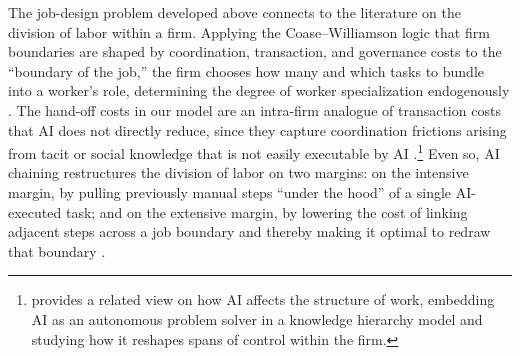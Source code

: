 The job-design problem developed above connects to the literature on the division of labor within a firm.
Applying the Coase--Williamson logic that firm boundaries are shaped by coordination, transaction, and governance costs \citep{coase1937nature, williamson1971vertical, williamson1979transaction} to the ``boundary of the job,'' the firm chooses how many and which tasks to bundle into a worker's role, determining the degree of worker specialization endogenously \citep{murphy1986specialization, becker1992division, dessein2006adaptive}.
The hand-off costs in our model are an intra-firm analogue of transaction costs that AI does not directly reduce, since they capture coordination frictions arising from tacit or social knowledge that is not easily executable by AI \citep{deming2017growing}.\footnote{
\cite{ide2025ai} provides a related view on how AI affects the structure of work, embedding AI as an autonomous problem solver in a knowledge hierarchy model \citep{garicano2000hierarchies, garicano2006organization} and studying how it reshapes spans of control within the firm.
}
Even so, AI chaining restructures the division of labor on two margins: on the intensive margin, by pulling previously manual steps ``under the hood'' of a single AI-executed task; and on the extensive margin, by lowering the cost of linking adjacent steps across a job boundary and thereby making it optimal to redraw that boundary \citep{autor2025expertise}.
